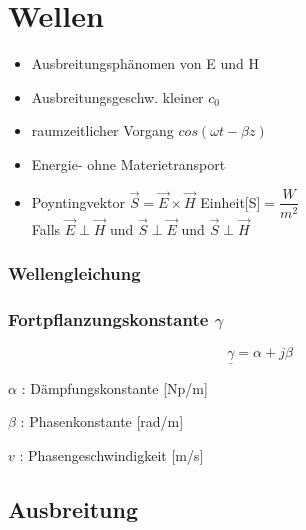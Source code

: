 \section{Wellen}
\begin{itemize}
    \setlength\itemsep{1pt}
    \item Ausbreitungsphänomen von E und H
    \item Ausbreitungsgeschw. kleiner $c_0$
    \item raumzeitlicher Vorgang $cos(\omega t- \beta z)$
    \item Energie- ohne Materietransport
    \item Poyntingvektor $\vec{S}=\vec{E}\times\vec{H}$ Einheit[S]$= \dfrac{W}{m^2}$\\
          {\footnotesize Falls $\vec{E}\perp\vec{H}$ und $\vec{S}\perp\vec{E}$ und $\vec{S}\perp\vec{H}$}
\end{itemize}

\subsubsection*{Wellengleichung}

\subsubsection*{Fortpflanzungskonstante $\gamma$}
\[\boxed{\underline{\gamma}=\alpha+j\beta}\]

$\alpha$ : Dämpfungskonstante [Np/m]

$\beta$ : Phasenkonstante [rad/m]

$v$ : Phasengeschwindigkeit [m/s]

\subsection{Ausbreitung}
